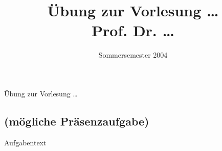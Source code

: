 \documentclass[
colorbacktitle,
accentcolor=0b,
compat=true]{tudaexercise}
\title{Übung zur Vorlesung \ldots\\ Prof. Dr. \ldots}
\subtitle{Sommersemester 2004}
\let\textmb\textmd
\begin{document}
\begin{examheader}
	\textmb{Übung zur Vorlesung \ldots}
	\examheaderdefault
\end{examheader}


\setcounter{section}{9}

\maketitle
  \subsection{(mögliche Präsenzaufgabe)}
   Aufgabentext
\end{document}
